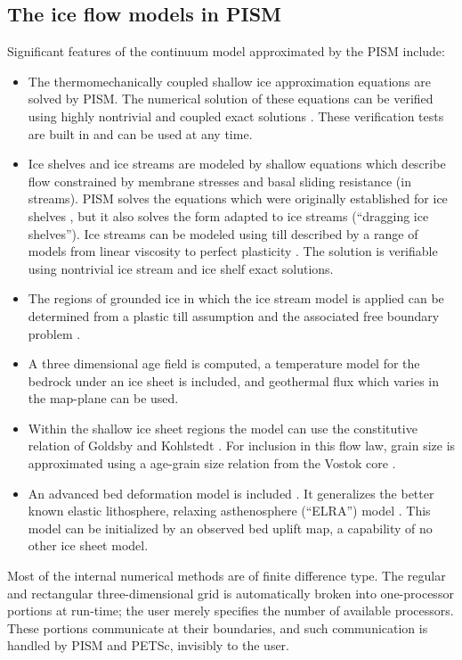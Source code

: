 \documentclass[12pt,final]{amsart}
\begin{document}
\subsection*{The ice flow models in PISM}  Significant features of the continuum model approximated by the PISM include:\begin{itemize}
\item The thermomechanically coupled shallow ice approximation equations \citep{Hutter,EISMINT00} are solved by PISM.  The numerical solution of these equations can be verified using highly nontrivial and coupled exact solutions \citep{BLKCB,BBL}.  These verification tests are built in and can be used at any time.
\item Ice shelves and ice streams are modeled by shallow equations which describe flow constrained by membrane stresses and basal sliding resistance (in streams).  PISM solves the equations which were originally established for ice shelves \citep{Morland}, but it also solves the form adapted to ice streams (``dragging ice shelves'').  Ice streams can be modeled using till described by a range of models from linear viscosity to perfect plasticity \citep{MacAyeal,SchoofStream}.  The solution is verifiable using nontrivial ice stream and ice shelf exact solutions.
\item The regions of grounded ice in which the ice stream model is applied can be determined from a plastic till assumption and the associated free boundary problem \citep{SchoofStream}.
\item A three dimensional age field is computed, a temperature model for the bedrock under an ice sheet is included, and geothermal flux which varies in the map-plane can be used.
\item Within the shallow ice sheet regions the model can use the constitutive relation of Goldsby and Kohlstedt \citep{GoldsbyKohlstedt}.  For inclusion in this flow law, grain size is approximated using a age-grain size relation from the Vostok core \citep{VostokCore}.
\item An advanced bed deformation model is included \citep{BLKfastearth,LingleClark}.  It generalizes the better known elastic lithosphere, relaxing asthenosphere (``ELRA'') model \citep{Greve2001}.  This model can be initialized by an observed bed uplift map, a capability of no other ice sheet model.\end{itemize}

Most of the internal numerical methods are of finite difference type.  The regular and rectangular three-dimensional grid is automatically broken into one-processor portions at run-time; the user merely specifies the number of available processors.  These portions communicate at their boundaries, and such communication is handled by PISM and PETSc, invisibly to the user.
\end{document}

